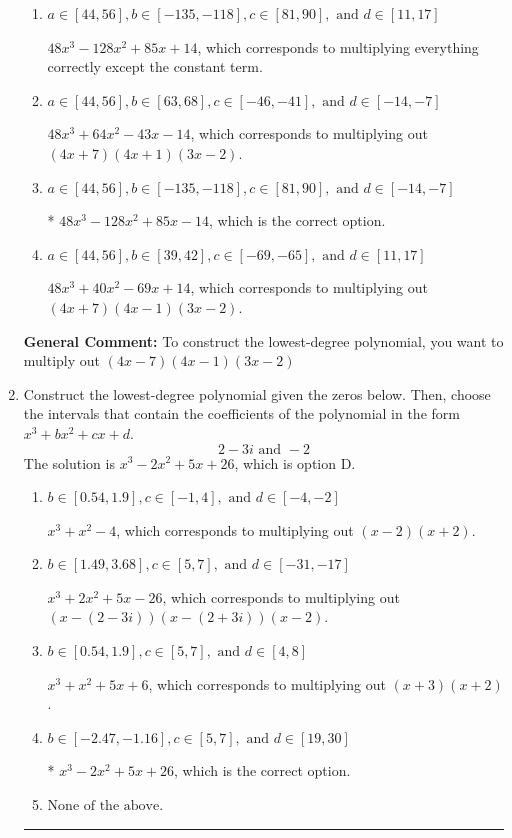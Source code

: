 \documentclass{extbook}[14pt]
\newcommand{\litem}[1]{\item #1

\rule{\textwidth}{0.4pt}}
\begin{document}
\begin{enumerate}
{\begin{enumerate}[label=\Alph*.]
$48x^{3} +128 x^{2} +85 x + 14$, which corresponds to multiplying out $(4x + 7)(4x + 1)(3x + 2)$.
\item \( a \in [44, 56], b \in [-135, -118], c \in [81, 90], \text{ and } d \in [11, 17] \)

$48x^{3} -128 x^{2} +85 x + 14$, which corresponds to multiplying everything correctly except the constant term.
\item \( a \in [44, 56], b \in [63, 68], c \in [-46, -41], \text{ and } d \in [-14, -7] \)

$48x^{3} +64 x^{2} -43 x -14$, which corresponds to multiplying out $(4x + 7)(4x + 1)(3x -2)$.
\item \( a \in [44, 56], b \in [-135, -118], c \in [81, 90], \text{ and } d \in [-14, -7] \)

* $48x^{3} -128 x^{2} +85 x -14$, which is the correct option.
\item \( a \in [44, 56], b \in [39, 42], c \in [-69, -65], \text{ and } d \in [11, 17] \)

$48x^{3} +40 x^{2} -69 x + 14$, which corresponds to multiplying out $(4x + 7)(4x -1)(3x -2)$.
\end{enumerate}

\textbf{General Comment:} To construct the lowest-degree polynomial, you want to multiply out $(4x -7)(4x -1)(3x -2)$
}
\litem{
Construct the lowest-degree polynomial given the zeros below. Then, choose the intervals that contain the coefficients of the polynomial in the form $x^3+bx^2+cx+d$.
\[ 2 - 3 i \text{ and } -2 \]The solution is \( x^{3} -2 x^{2} +5 x + 26 \), which is option D.\begin{enumerate}[label=\Alph*.]
\item \( b \in [0.54, 1.9], c \in [-1, 4], \text{ and } d \in [-4, -2] \)

$x^{3} + x^{2} -4$, which corresponds to multiplying out $(x -2)(x + 2)$.
\item \( b \in [1.49, 3.68], c \in [5, 7], \text{ and } d \in [-31, -17] \)

$x^{3} +2 x^{2} +5 x -26$, which corresponds to multiplying out $(x-(2 - 3 i))(x-(2 + 3 i))(x -2)$.
\item \( b \in [0.54, 1.9], c \in [5, 7], \text{ and } d \in [4, 8] \)

$x^{3} + x^{2} +5 x + 6$, which corresponds to multiplying out $(x + 3)(x + 2)$.
\item \( b \in [-2.47, -1.16], c \in [5, 7], \text{ and } d \in [19, 30] \)

* $x^{3} -2 x^{2} +5 x + 26$, which is the correct option.
\item \( \text{None of the above.} \)


\end{enumerate}}
\end{enumerate}
\end{document}
